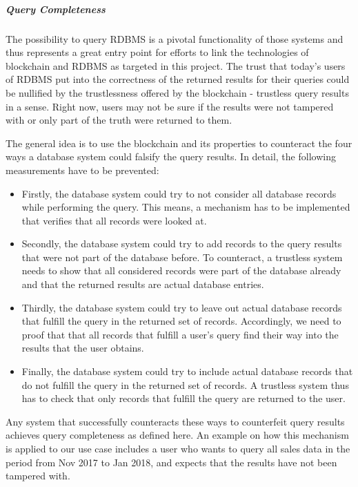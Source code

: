\subparagraph{Query Completeness}

The possibility to query RDBMS is a pivotal functionality of those systems and thus represents a great entry point for efforts to link the technologies of blockchain and RDBMS as targeted in this project. The trust that today’s users of RDBMS put into the correctness of the returned results for their queries could be nullified by the trustlessness offered by the blockchain - trustless query results in a sense. Right now, users may not be sure if the results were not tampered with or only part of the truth were returned to them.


The general idea is to use the blockchain and its properties to counteract the four ways a database system could falsify the query results. In detail, the following measurements have to be prevented:
\begin{itemize}
\item Firstly, the database system could try to not consider all database records while performing the query. This means, a mechanism has to be implemented that verifies that all records were looked at.
\item Secondly, the database system could try to add records to the query results that were not part of the database before. To counteract, a trustless system needs to show that all considered records were part of the database already and that the returned results are actual database entries.
\item Thirdly, the database system could try to leave out actual database records that fulfill the query in the returned set of records. Accordingly, we need to proof that that all records that fulfill a user’s query find their way into the results that the user obtains.
\item Finally, the database system could try to include actual database records that do not fulfill the query in the returned set of records. A trustless system thus has to check that only records that fulfill the query are returned to the user.
\end{itemize} 

Any system that successfully counteracts these ways to counterfeit query results achieves query completeness as defined here. An example on how this mechanism is applied to our use case includes a user who wants to query all sales data in the period from Nov 2017 to Jan 2018, and expects that the results have not been tampered with.

